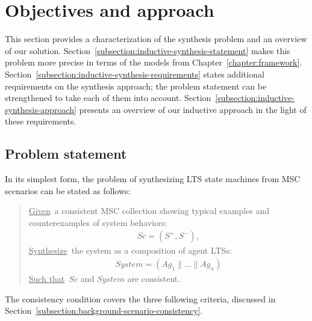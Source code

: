 \section{Objectives and approach\label{section:inductive-objectives-and-approach}}

This section provides a characterization of the synthesis problem and an overview of our solution. Section~\ref{subsection:inductive-synthesis-statement} makes this problem more precise in terms of the models from Chapter~\ref{chapter:framework}. Section~\ref{subsection:inductive-synthesis-requirements} states additional requirements on the synthesis approach; the problem statement can be strengthened to take each of them into account. Section~\ref{subsection:inductive-synthesis-approach} presents an overview of our inductive approach in the light of these requirements.


\subsection{Problem statement\label{subsection:inductive-synthesis-statement}}

In its simplest form, the problem of synthesizing LTS state machines from MSC scenarios can be stated as follows:

\begin{quote}
\underline{Given}~a consistent MSC collection showing typical examples and counterexamples of system behaviors:
\begin{align*}
Sc = (S^+,S^-),
\end{align*}
\underline{Synthesize}~the system as a composition of agent LTSs:
\begin{align*}
System = (Ag_1 \parallel \ldots \parallel Ag_n)
\end{align*}
\underline{Such that}~$Sc$ and $System$ are consistent.
\end{quote}

The consistency condition covers the three following criteria, discussed in Section~\ref{subsection:background-scenario-consistency}.

